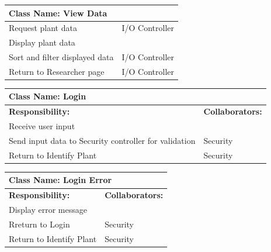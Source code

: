 \documentclass[]{article}
\begin{document}
		\centering
		\begin{tabular}{|p{7cm}|p{7cm}|}
		\hline 
		 \multicolumn{2}{|l|}{\textbf{Class Name: View Data}} \\
		\hline
		Request plant data & I/O Controller\\
		\hline
		Display plant data & \\
		\hline
		Sort and filter displayed data & I/O Controller\\
		\hline
		Return to Researcher page & I/O Controller\\
		\hline
		\end{tabular}
	\newline
	\vspace*{0.5 cm}
	\newline

		\centering
		\begin{tabular}{|p{7cm}|p{7cm}|}
		\hline 
		 \multicolumn{2}{|l|}{\textbf{Class Name: Login}} \\
		\hline
		\textbf{Responsibility:} & \textbf{Collaborators:} \\
		\hline
		Receive user input & \\
		\hline
		Send input data to Security controller for validation & Security\\
		\hline
		Return to Identify Plant & Security\\
		\hline
		\end{tabular}
	\newline
	\vspace*{0.5 cm}
	\newline
		\centering
		\begin{tabular}{|p{7cm}|p{7cm}|}
		\hline 
		 \multicolumn{2}{|l|}{\textbf{Class Name: Login Error}} \\
		\hline
		\textbf{Responsibility:} & \textbf{Collaborators:} \\
		\hline
		Display error message & \\
		\hline		
		Rreturn to Login & Security\\
		\hline
		Return to Identify Plant & Security\\
		\hline
		\end{tabular}
	\newline
	\vspace*{0.5 cm}
	\newline
\end{document}
